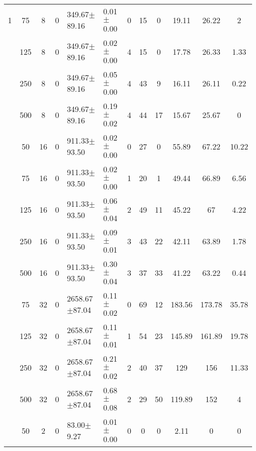 \documentclass[article]{llncs}
\begin{document}
\begin{table}[h]
\begin{center}
\begin{tabular}{c c c c l l c c c c c c}
1&75      &  8   &    0  &  349.67$\pm$89.16    &        0.01$\pm$0.00  &  0  &          15  &            0   &         19.11   &       26.22   &  2       \\
 &125     &  8   &    0  &  349.67$\pm$89.16    &        0.02$\pm$0.00  &  4  &          15  &            0   &         17.78   &       26.33   &  1.33    \\
 &250     &  8   &    0  &  349.67$\pm$89.16    &        0.05$\pm$0.00  &  4  &          43  &            9   &         16.11   &       26.11   &  0.22    \\
 &500     &  8   &    0  &  349.67$\pm$89.16    &        0.19$\pm$0.02  &  4  &          44  &            17  &         15.67   &       25.67   &  0       \\
 &50      &  16  &    0  &  911.33$\pm$93.50    &        0.02$\pm$0.00  &  0  &          27  &            0   &         55.89   &       67.22   &  10.22   \\
 &75      &  16  &    0  &  911.33$\pm$93.50    &        0.02$\pm$0.00  &  1  &          20  &            1   &         49.44   &       66.89   &  6.56    \\
 &125     &  16  &    0  &  911.33$\pm$93.50    &        0.06$\pm$0.04  &  2  &          49  &            11  &         45.22   &       67      &  4.22    \\
 &250     &  16  &    0  &  911.33$\pm$93.50    &        0.09$\pm$0.01  &  3  &          43  &            22  &         42.11   &       63.89   &  1.78    \\
 &500     &  16  &    0  &  911.33$\pm$93.50    &        0.30$\pm$0.04  &  3  &          37  &            33  &         41.22   &       63.22   &  0.44    \\
 &75      &  32  &    0  &  2658.67$\pm$87.04   &        0.11$\pm$0.02  &  0  &          69  &            12  &         183.56  &       173.78  &  35.78   \\
 &125     &  32  &    0  &  2658.67$\pm$87.04   &        0.11$\pm$0.01  &  1  &          54  &            23  &         145.89  &       161.89  &  19.78   \\
 &250     &  32  &    0  &  2658.67$\pm$87.04   &        0.21$\pm$0.02  &  2  &          40  &            37  &         129     &       156     &  11.33   \\
 &500     &  32  &    0  &  2658.67$\pm$87.04   &        0.68$\pm$0.08  &  2  &          29  &            50  &         119.89  &       152     &  4       \\
 \hline
 &50      &  2   &    0  &  83.00$\pm$9.27      &        0.01$\pm$0.00  &  0  &          0   &            0   &         2.11    &       0       &  0       \\

\end{tabular}
\end{center}
\end{table}
\end{document}

